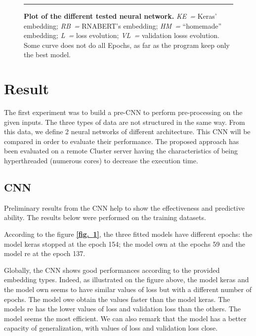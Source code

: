 \documentclass[12pt, oneside, a4paper]{report}
\newcommand{\fref}[1]{\hyperref[#1]{\textbf{[fig.~\ref*{#1}]}}}
\begin{document}
\begin{multicols}{2}
\begin{figure}[!tb]
    \small
    \vspace{0.5ex}
    
    \hrule height 1pt
    
    \vspace{1ex}
    
    \caption{
        \textbf{Plot of the different tested neural network.} \textit{KE~=} Keras' embedding; \textit{RB~=} RNABERT's embedding; \textit{HM~=} ``homemade'' embedding; \textit{L~=} loss evolution; \textit{VL~=} validation losss evolution. Some curve does not do all Epochs, as far as the program keep only the best model.
        \label{f:loss_function}}
\end{figure}

\section{Result}
The first experiment was to build a pre-CNN to perform pre-processing on the given inputs. The three types of data are not structured in the same way. From this data, we define 2 neural networks of different architecture. This CNN will be compared in order to evaluate their performance. The proposed approach has been evaluated on a remote Cluster server having the characteristics of being hyperthreaded (numerous cores) to decrease the execution time.

\subsection{CNN}
Preliminary results from the CNN help to show the effectiveness and predictive ability. The results below were performed on the training datasets.

According to the figure \fref{f:loss_function}, the three fitted models have different epochs: the model keras stopped at the epoch 154; the model own at the epochs 59 and the model re at the epoch 137.

 Globally, the CNN shows good performances according to the provided embedding types. Indeed, as illustrated on the figure above, the model keras and the model own seems to have similar values of loss but with a different number of epochs. The model owe obtain the values faster than the model keras.
The models re has the lower values of loss and validation loss than the others. The model seems the most efficient. We can also remark that the model has a better capacity of generalization, with values of loss and validation loss close.


\end{multicols}
\end{document}
